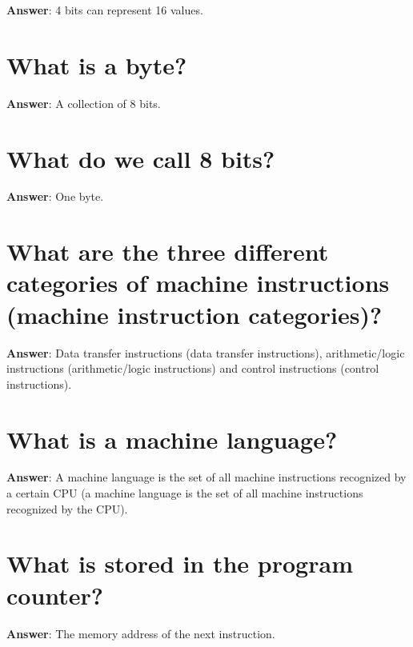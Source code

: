 \documentclass[a4paper,11pt,oneside]{book}
\begin{document}
\begin{sloppypar}
\label{q:90:sa:en:True}

\textbf{Answer}: 4 bits can represent 16 values.



\section{What is a byte?}

\label{q:91:sa:en:True}

\textbf{Answer}: A collection of 8 bits.



\section{What do we call 8 bits?}

\label{q:92:sa:en:True}

\textbf{Answer}: One byte.



\section{What are the three different categories of machine instructions (machine instruction categories)?}

\label{q:93:sa:en:True}

\textbf{Answer}: Data transfer instructions (data transfer instructions), arithmetic/logic instructions (arithmetic/logic instructions) and control instructions (control instructions).



\section{What is a machine language?}

\label{q:94:sa:en:True}

\textbf{Answer}: A machine language is the set of all machine instructions recognized by a certain CPU (a machine language is the set of all machine instructions recognized by the CPU).



\section{What is stored in the program counter?}

\label{q:95:sa:en:True}

\textbf{Answer}: The memory address of the next instruction.




\end{sloppypar}
\end{document}
